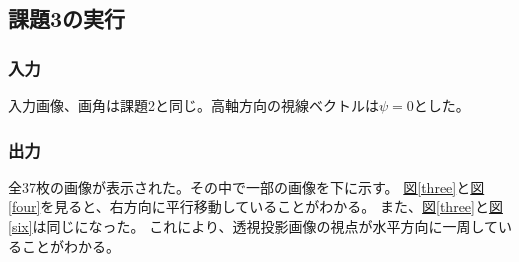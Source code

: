 \documentclass[]{jarticle}          %
\begin{document}
\subsection{課題3の実行}
\subsubsection{入力}
入力画像、画角は課題2と同じ。高軸方向の視線ベクトルは$\psi = 0$とした。
\subsubsection{出力}
全37枚の画像が表示された。その中で一部の画像を下に示す。
\hyperref[three]{図\ref{three}}と\hyperref[four]{図\ref{four}}を見ると、右方向に平行移動していることがわかる。
また、\hyperref[three]{図\ref{three}}と\hyperref[six]{図\ref{six}}は同じになった。
これにより、透視投影画像の視点が水平方向に一周していることがわかる。
\end{document}

